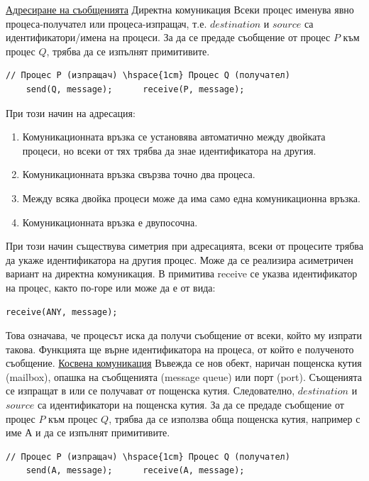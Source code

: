 \documentclass{article}
\begin{document}
\underline{Адресиране на съобщенията} \newline\newline
Директна комуникация \newline\newline
Всеки процес именува явно процеса-получател или процеса-изпращач, т.е. $destination$ и $source$ са идентификатори/имена на процеси. За да се предаде
съобщение от процес $P$ към процес $Q$, трябва да се изпълнят примитивите.
\begin{lstlisting}[style=CStyle]
// Процес P (изпращач) \hspace{1cm} Процес Q (получател)
    send(Q, message);      receive(P, message);
\end{lstlisting}
При този начин на адресация:
\begin{enumerate}
    \item Комуникационната връзка се установява автоматично между двойката процеси, но всеки от тях трябва да знае идентификатора на другия.
    \item Комуникационната връзка свързва точно два процеса.
    \item Между всяка двойка процеси може да има само една комуникационна връзка.
    \item Комуникационната връзка е двупосочна.
\end{enumerate}
При този начин съществува симетрия при адресацията, всеки от процесите трябва да укаже идентификатора на другия процес. Може да се реализира асиметричен
вариант на директна комуникация. В примитива receive се указва идентификатор на процес, както по-горе или може да е от вида:
\begin{lstlisting}[style=CStyle]
receive(ANY, message);
\end{lstlisting}
Това означава, че процесът иска да получи съобщение от всеки, който му изпрати такова. Функцията ще върне идентификатора на процеса, от който е полученото
съобщение.
\underline{Косвена комуникация} \newline\newline
Въвежда се нов обект, наричан пощенска кутия (mailbox), опашка на съобщенията (message queue) или порт (port). Съощенията се изпращат в или се
получават от пощенска кутия. Следователно, $destination$ и $source$ са идентификатори на пощенска кутия. За да се предаде съобщение от процес $P$ към
процес $Q$, трябва да се използва обща пощенска кутия, например с име А и да се изпълнят примитивите.
\begin{lstlisting}[style=CStyle]
// Процес P (изпращач) \hspace{1cm} Процес Q (получател)
    send(A, message);      receive(A, message);
\end{lstlisting}
\end{document}

